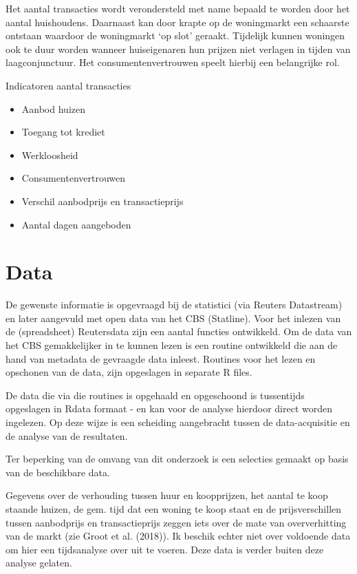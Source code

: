 \documentclass[
]{article}
\providecommand{\tightlist}{%
  \setlength{\itemsep}{0pt}\setlength{\parskip}{0pt}}
\begin{document}
Het aantal transacties wordt verondersteld met name bepaald te worden
door het aantal huishoudens. Daarnaast kan door krapte op de woningmarkt
een schaarste ontstaan waardoor de woningmarkt `op slot' geraakt.
Tijdelijk kunnen woningen ook te duur worden wanneer huiseigenaren hun
prijzen niet verlagen in tijden van laagconjunctuur. Het
consumentenvertrouwen speelt hierbij een belangrijke rol.

Indicatoren aantal transacties

\begin{itemize}
\tightlist
\item
  Aanbod huizen
\item
  Toegang tot krediet
\item
  Werkloosheid
\item
  Consumentenvertrouwen
\item
  Verschil aanbodprijs en transactieprijs
\item
  Aantal dagen aangeboden
\end{itemize}

\hypertarget{data}{%
\section{Data}\label{data}}

De gewenste informatie is opgevraagd bij de statistici (via Reuters
Datastream) en later aangevuld met open data van het CBS (Statline).
Voor het inlezen van de (spreadsheet) Reutersdata zijn een aantal
functies ontwikkeld. Om de data van het CBS gemakkelijker in te kunnen
lezen is een routine ontwikkeld die aan de hand van metadata de
gevraagde data inleest. Routines voor het lezen en opschonen van de
data, zijn opgeslagen in separate R files.

De data die via die routines is opgehaald en opgeschoond is tussentijds
opgeslagen in Rdata formaat - en kan voor de analyse hierdoor direct
worden ingelezen. Op deze wijze is een scheiding aangebracht tussen de
data-acquisitie en de analyse van de resultaten.

Ter beperking van de omvang van dit onderzoek is een selecties gemaakt
op basis van de beschikbare data.

Gegevens over de verhouding tussen huur en koopprijzen, het aantal te
koop staande huizen, de gem. tijd dat een woning te koop staat en de
prijsverschillen tussen aanbodprijs en transactieprijs zeggen iets over
de mate van oververhitting van de markt (zie Groot et al. (2018)). Ik
beschik echter niet over voldoende data om hier een tijdsanalyse over
uit te voeren. Deze data is verder buiten deze analyse gelaten.
\end{document}
